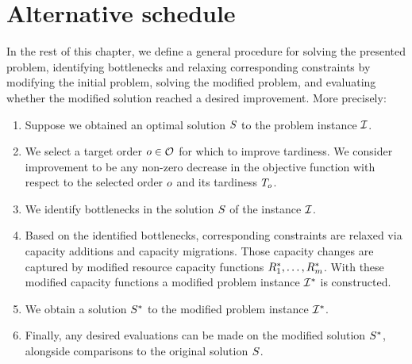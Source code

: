 \section{Alternative schedule} \label{sec:problem-statement/alternative-schedule}

In the rest of this chapter, we define a general procedure for solving the presented problem,
identifying bottlenecks and relaxing corresponding constraints by modifying the initial problem,
solving the modified problem,
and evaluating whether the modified solution reached a desired improvement.
More precisely:

\begin{enumerate}
    \item Suppose we obtained an optimal solution $S$ to the problem instance $\mathcal{I}$.

    \item We select a target order $o \in \mathcal{O}$ for which to improve tardiness.
        We consider improvement to be any non-zero decrease in the objective function with respect to the
        selected order $o$ and its tardiness $T_{o}$.

    \item We identify bottlenecks in the solution $S$ of the instance $\mathcal{I}$.

    \item Based on the identified bottlenecks, corresponding constraints are relaxed via
        capacity additions and capacity migrations.
        Those capacity changes are captured by modified resource capacity functions
        $R_{1}^*, \ldots, R_{m}^*$.
        With these modified capacity functions a modified problem instance $\mathcal{I}^*$ is constructed.

    \item We obtain a solution $S^*$ to the modified problem instance $\mathcal{I}^*$.

    \item Finally, any desired evaluations can be made on the modified solution $S^*$,
        alongside comparisons to the original solution $S$.
\end{enumerate}
